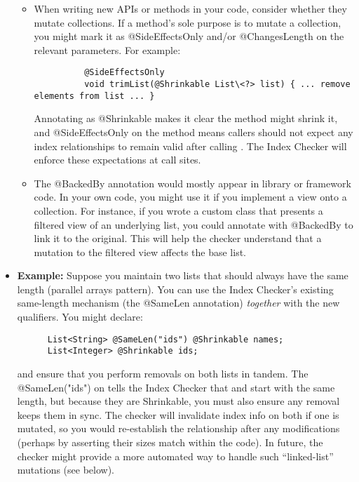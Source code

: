 \begin{itemize}
\begin{itemize}
    \item 
      When writing new APIs or methods in your code, consider whether they mutate collections. If a method’s sole 
      purpose is to mutate a collection, you might mark it as @SideEffectsOnly and/or @ChangesLength on the 
      relevant parameters. For example:
        \begin{Verbatim}
          @SideEffectsOnly
          void trimList(@Shrinkable List\<?> list) { ... remove elements from list ... }
        \end{Verbatim}
      Annotating  as @Shrinkable makes it clear the method might shrink it, and @SideEffectsOnly 
      on the method means callers should not expect any index relationships to remain valid after calling 
      . The Index Checker will enforce these expectations at call sites.
    \item 
      The @BackedBy annotation would mostly appear in library or framework code. In your own code, you might use 
      it if you implement a view onto a collection. For instance, if you wrote a custom class  
      that presents a filtered view of an underlying list, you could annotate  with @BackedBy 
      to link it to the original. This will help the checker understand that a mutation to the filtered view 
      affects the base list.
  \end{itemize}
\item
  \textbf{Example:}
    Suppose you maintain two lists that should always have the same length (parallel arrays pattern).
    You can use the Index Checker’s existing same-length mechanism (the @SameLen annotation)
    \emph{together} with the new qualifiers. You might declare:

    \begin{Verbatim}
      List<String> @SameLen("ids") @Shrinkable names;
      List<Integer> @Shrinkable ids;
    \end{Verbatim}
  and ensure that you perform removals on both lists in tandem. The @SameLen("ids") on 
  tells the Index Checker that  and  start with the same length, but because
  they are Shrinkable, you must also ensure any removal keeps them in sync. The checker will
  invalidate index info on both if one is mutated, so you would re-establish the relationship
  after any modifications (perhaps by asserting their sizes match within the code). In future, the
  checker might provide a more automated way to handle such “linked-list” mutations (see below).


\end{itemize}

